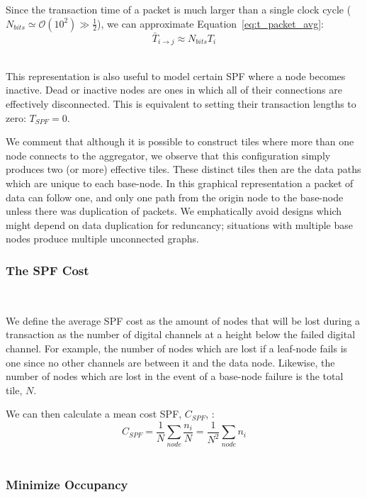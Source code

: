 Since the transaction time of a packet is much larger than a single clock cycle ($N_{bits} \simeq \mathcal{O}(10^{2}) \gg \frac{1}{2}$), we can approximate Equation~\ref{eq:t_packet_avg}:
\begin{equation}
\bar{T}_{i\rightarrow j} \approx N_{bits}T_{i}
\end{equation}~\label{eq:t_packet}

This representation is also useful to model certain SPF where a node becomes inactive.
Dead or inactive nodes are ones in which all of their connections are effectively disconnected.
This is equivalent to setting their transaction lengths to zero: $T_{SPF} = 0$.

We comment that although it is possible to construct tiles where more than one node connects to the aggregator, we observe that this configuration simply produces two (or more) effective tiles.
These distinct tiles then are the data paths which are unique to each base-node.
In this graphical representation a packet of data can follow one, and only one path from the origin node to the base-node unless there was duplication of packets.
We emphatically avoid designs which might depend on data duplication for reduncancy; situations with multiple base nodes produce multiple unconnected graphs.

\subsubsection{The SPF Cost}~\label{sec:spf_cost}

We define the average SPF cost as the amount of nodes that will be lost during a transaction as the number of digital channels at a height below the failed digital channel.
For example, the number of nodes which are lost if a leaf-node fails is one since no other channels are between it and the data node.
Likewise, the number of nodes which are lost in the event of a base-node failure is the total tile, $N$.

We can then calculate a mean cost SPF, $C_{SPF}$, :
\begin{equation}
  C_{SPF} = \frac{1}{N}\sum_{node} \frac{n_{i}}{N} = \frac{1}{N^{2}}\sum_{node} n_{i}
\end{equation}~\label{eq:cspf}

\subsubsection{Minimize Occupancy}~\label{sec:min_conn}

